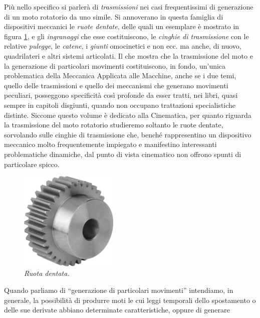 \noindent Pi\`u nello specifico
si parler\`a di
{\em trasmissioni}
nei casi frequentissimi di generazione di un moto rotatorio da uno simile.
Si annoverano in questa famiglia di dispositivi meccanici
le {\em ruote dentate}, delle quali un esemplare
\`e mostrato in figura \ref{fig:f2a}, e gli {\em ingranaggi}
che esse costituiscono,
le {\em cinghie di trasmissione} con le
relative {\em pulegge}, le
{\em catene}, i {\em giunti} omocinetici e non ecc. ma anche, di nuovo,
quadrilateri e altri sistemi articolati.
Il che mostra che la trasmissione del moto e la generazione di particolari
movimenti costituiscono, in fondo,
un'unica problematica della Meccanica Applicata alle
Macchine, anche se i due temi, quello delle trasmissioni e quello
dei meccanismi che generano movimenti peculiari,
posseggono specificit\`a cos\`i
profonde da esser tratti, nei libri, quasi sempre in capitoli disgiunti,
quando non occupano trattazioni specialistiche distinte.
Siccome questo volume \`e dedicato alla Cinematica, per quanto
riguarda la trasmissione del moto rotatorio studieremo
soltanto le ruote dentate, sorvolando sulle cinghie di trasmissione che,
bench\'e rappresentino un dispositivo meccanico molto frequentemente
impiegato e manifestino interessanti problematiche dinamiche,
dal punto di vista cinematico non offrono spunti di particolare
spicco.
\begin{figure}
     \begin{center}
     \includegraphics[width=0.42\textwidth]{part2/ruote/FIG/f2a.jpeg}
     \end{center}
        \caption{\em Ruota dentata.}
     \label{fig:f2a}
\end{figure}
\noindent Quando parliamo di ``generazione di particolari movimenti''
intendiamo, in generale, la possibilit\`a di
produrre moti le cui leggi temporali dello spostamento o delle
sue derivate abbiano determinate caratteristiche, oppure di generare
